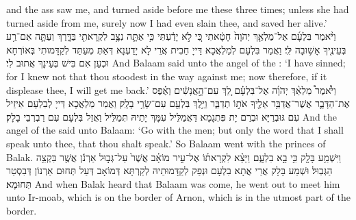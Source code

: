 {and the ass saw me, and turned aside before me these three times; unless she had turned aside from me, surely now I had even slain thee, and saved her alive.’}{}
{וַיֹּ֨אמֶר בִּלְעָ֜ם אֶל־מַלְאַ֤ךְ יְהֹוָה֙ חָטָ֔אתִי כִּ֚י לֹ֣א יָדַ֔עְתִּי כִּ֥י אַתָּ֛ה נִצָּ֥ב לִקְרָאתִ֖י בַּדָּ֑רֶךְ וְעַתָּ֛ה אִם־רַ֥ע בְּעֵינֶ֖יךָ אָשׁ֥וּבָה לִּֽי׃
}
{וַאֲמַר בִּלְעָם לְמַלְאֲכָא דַּייָ חַבִית אֲרֵי לָא יָדַעְנָא דְּאַתְּ מְעַתַּד לְקַדָּמוּתִי בְּאוֹרְחָא וּכְעַן אִם בִּישׁ בְּעֵינָךְ אֲתוּב לִי׃}
{And Balaam said unto the angel of the \lord: ‘I have sinned; for I knew not that thou stoodest in the way against me; now therefore, if it displease thee, I will get me back.’}{}
{וַיֹּ֩אמֶר֩ מַלְאַ֨ךְ יְהֹוָ֜ה אֶל־בִּלְעָ֗ם לֵ֚ךְ עִם־הָ֣אֲנָשִׁ֔ים וְאֶ֗פֶס אֶת־הַדָּבָ֛ר אֲשֶׁר־אֲדַבֵּ֥ר אֵלֶ֖יךָ אֹת֣וֹ תְדַבֵּ֑ר וַיֵּ֥לֶךְ בִּלְעָ֖ם עִם־שָׂרֵ֥י בָלָֽק׃
}
{וַאֲמַר מַלְאֲכָא דַּייָ לְבִלְעָם אִיזֵיל עִם גּוּבְרַיָּא וּבְרַם יָת פִּתְגָמָא דַּאֲמַלֵּיל עִמָּךְ יָתֵיהּ תְּמַלֵּיל וַאֲזַל בִּלְעָם עִם רַבְרְבֵי בָלָק׃}
{And the angel of the \lord\space said unto Balaam: ‘Go with the men; but only the word that I shall speak unto thee, that thou shalt speak.’ So Balaam went with the princes of Balak.}{}
{וַיִּשְׁמַ֥ע בָּלָ֖ק כִּ֣י בָ֣א בִלְעָ֑ם וַיֵּצֵ֨א לִקְרָאת֜וֹ אֶל־עִ֣יר מוֹאָ֗ב אֲשֶׁר֙ עַל־גְּב֣וּל אַרְנֹ֔ן אֲשֶׁ֖ר בִּקְצֵ֥ה הַגְּבֽוּל׃
}
{וּשְׁמַע בָּלָק אֲרֵי אֲתָא בִלְעָם וּנְפַק לְקַדָּמוּתֵיהּ לְקַרְתָּא דְּמוֹאָב דְּעַל תְּחוּם אַרְנוֹן דְּבִסְטַר תְּחוּמָא׃}
{And when Balak heard that Balaam was come, he went out to meet him unto Ir-moab, which is on the border of Arnon, which is in the utmost part of the border.}{}
